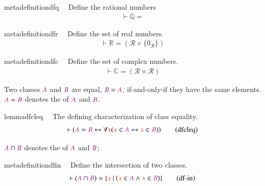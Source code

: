 \begin{restatable}{metadefinition}{dfq}~~ Define the rational numbers
\begin{align}
\vdash \mathbb{Q} = 
    \label{eq:df-q}\tag{df-q}
\end{align}
\end{restatable}

\begin{restatable}{metadefinition}{dfr}~~ Define the set of real numbers. 
\begin{align}
\vdash \mathbb{R} = ( \mathcal{R} \times \{ 0_\mathcal{R} \}
    )\label{eq:df-r}\tag{df-r}
\end{align}
\end{restatable}

\begin{restatable}{metadefinition}{dfc}~~ Define the set of complex numbers.  \begin{align}
\vdash \mathbb{C} = ( \mathcal{R} \times \mathcal{R} )\label{eq:df-c}\tag{df-c}
\end{align}
\end{restatable}


\pn Two classes $\mc{A}$ and $\mc{B}$ are equal, $\mc{B}=\mc{A}$, if-and-only-if they have the same elements. \\
$\mc{A} = \mc{B}$ denotes the  of $\mc{A}$ and $\mc{B}$.
\begin{restatable}{lemma}{dfcleq}~~ The defining characterization of class
equality.  ~
\begin{align}
\vdash ( \mc{A} = \mc{B} \leftrightarrow \forall \msc{x} ( \msc{x} \in \mc{A}
    \leftrightarrow \msc{x} \in \mc{B} ) )\label{eq:dfcleq}\tag{dfcleq}
\end{align}
\end{restatable}

\pn $\mc{A}\cap \mc{B}$ denotes the  of $\mc{A}$ and $\mc{B}$; 
\begin{restatable}{metadefinition}{dfin}~~ Define the intersection of two classes. 
\begin{align}
\vdash ( \mc{A} \cap \mc{B} ) = \{ \msc{x}~\vert~( \msc{x} \in \mc{A} \wedge
    \msc{x} \in \mc{B} ) \}\label{eq:df-in}\tag{df-in}
\end{align}
\end{restatable}

